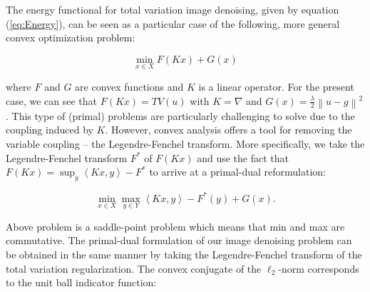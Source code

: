 \documentclass{paper}
\begin{document}
The energy functional for total variation image denoising, given by equation (\ref{eq:Energy}), can be seen as a particular case of the following, more general convex optimization problem:

\begin{equation}
\min_{x\in X}F(Kx)+G(x)
\label{eq:primalProblem}
\end{equation}

where \begin{math}F\end{math} and \begin{math}G\end{math} are convex functions and \begin{math}K\end{math} is a linear operator. For the present case, we can see that \begin{math}F(Kx)=TV(u)\end{math} with \begin{math}K=\nabla\end{math} and \begin{math}G(x)=\frac{\lambda}{2}\left\|u-g\right\|^{2}\end{math}. This type of (primal) problems are particularly challenging to solve due to the coupling induced by \begin{math}K\end{math}. However, convex analysis offers a tool for removing the variable coupling -- the Legendre-Fenchel transform. More specifically, we take the Legendre-Fenchel transform \begin{math}F^{\ast}\end{math} of \begin{math}F(Kx)\end{math} and use the fact that \begin{math}F(Kx)=\sup_{y}\left\langle Kx,y\right\rangle-F^{\ast}\end{math} to arrive at a primal-dual reformulation:

\begin{equation}
\min_{x\in X}\max_{y\in Y}\left\langle Kx,y\right\rangle-F^{\ast}(y)+G(x).
\label{eq:primalDualProblem} 
\end{equation}

Above problem is a saddle-point problem which means that min and max are commutative. The primal-dual formulation of our image denoising problem can be obtained in the same manner by taking the Legendre-Fenchel transform of the total variation regularization. The convex conjugate of the \begin{math}\ell_{2}\end{math}-norm corresponds to the unit ball indicator function:
\end{document}

